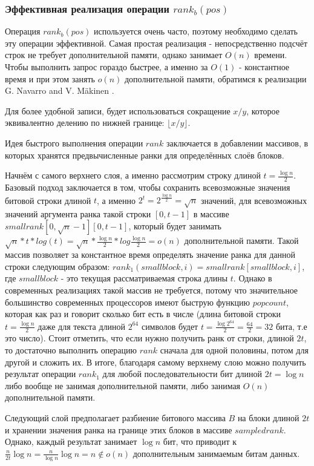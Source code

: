 \documentclass[a4paper,12pt]{article}
\begin{document}
\subsubsection{Эффективная реализация операции $rank_b(pos)$}
Операция $rank_b(pos)$ используется очень часто, поэтому необходимо сделать эту операции эффективной. Самая простая реализация - непосредственно подсчёт строк не требует дополнительной памяти, однако занимает $O(n)$ времени. Чтобы выполнить запрос гораздо быстрее, а именно за $O(1)$ - константное время и при этом занять $o(n)$ дополнительной памяти, обратимся к реализации G. Navarro and V. Mäkinen \cite{navarro2007compressed}.

Для более удобной записи, будет использоваться сокращение $x/y$, которое эквивалентно делению по нижней границе: $\lfloor x/y \rfloor$. 

Идея быстрого выполнения операции $rank$ заключается в добавлении массивов, в которых хранятся предвычисленные ранки для определённых слоёв блоков. 

Начнём с самого верхнего слоя, а именно рассмотрим строку длиной $t=\frac{\log{n}}{2}$. Базовый подход заключается в том, чтобы сохранить всевозможные значения битовой строки длиной $t$, а именно $2^{t} = 2^{\frac{\log{n}}{2}} = \sqrt{n}$ значений, для всевозможных значений аргумента ранка такой строки $[0, t-1]$ в массиве $smallrank[0, \sqrt{n}-1][0, t-1]$, который будет занимать $\sqrt{n} * t * log(t) = \sqrt{n} * \frac{\log{n}}{2} * log\frac{\log{n}}{2} = o(n)$ дополнительной памяти. Такой массив позволяет за константное время определять значение ранка для данной строки следующим образом: $rank_1(smallblock, i) = smallrank[smallblock, i]$, где $smallblock$ - это текущая рассматриваемая строка длины $t$. Однако в современных реализациях такой массив не требуется, потому что значительное большинство современных процессоров имеют быструю функцию $popcount$, которая как раз и говорит сколько бит есть в числе (длина битовой строки $t=\frac{\log{n}}{2}$ даже для текста длиной $2^{64}$ символов будет $t=\frac{\log{2^{64}}}{2}=\frac{64}{2}=32$ бита, т.е это число). Стоит отметить, что если нужно получить ранк от строки, длиной $2t$, то достаточно выполнить операцию $rank$ сначала для одной половины, потом для другой и сложить их. В итоге, благодаря самому верхнему слою можно получить результат операции $rank_1$ для любой последовательности бит длиной $2t = \log{n}$ либо вообще не занимая дополнительной памяти, либо занимая $O(n)$ дополнительной памяти.

Следующий слой предполагает разбиение битового массива $B$ на блоки длиной $2t$ и хранении значения ранка на границе этих блоков в массиве \newline$sampledrank$. Однако, каждый результат занимает $\log{n}$ бит, что приводит к $\frac{n}{2t} \log{n} = \frac{n}{\log{n}}\log{n} = n \notin o(n)$ дополнительным занимаемым битам данных.
\end{document}
